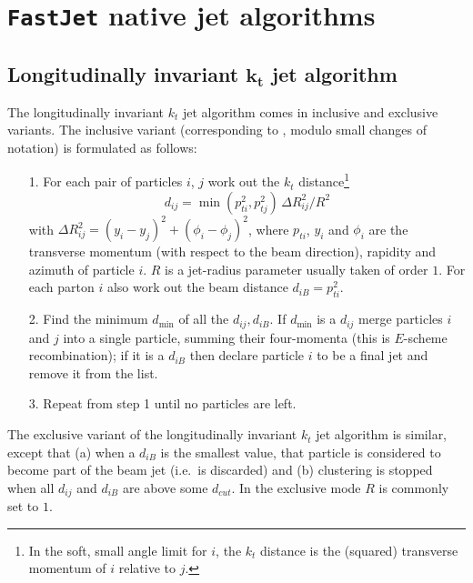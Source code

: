 \documentclass[12pt,a4]{article}
\newcommand{\fastjet}{\texttt{FastJet}\xspace}
\begin{document}
\section{\fastjet native jet algorithms}
\label{sec:native-algs}

\subsection[Longitudinally invariant $k_t$ jet algorithm]{Longitudinally invariant $\boldsymbol{k_t}$ jet algorithm}
%
The longitudinally invariant $k_t$ jet algorithm \cite{ktexcl,ktincl}
comes in inclusive and exclusive variants.
%
The inclusive variant (corresponding to \cite{ktincl}, modulo small
changes of notation) is formulated as follows:
\begin{itemize}
\item[1.] For each pair of particles $i$, $j$ work out the $k_t$
  distance\footnote{In the soft, small angle limit for $i$, the $k_t$
    distance is the (squared) transverse momentum of $i$ relative to $j$.}
  \begin{equation}
    \label{eq:dij}
    d_{ij} = \min(p_{ti}^2,{p_{tj}^2}) \, \Delta R_{ij}^2 / R^2
  \end{equation}
  with $\Delta R_{ij}^2 = (y_i-y_j)^2 + (\phi_i-\phi_j)^2$,
  where $p_{ti}$, $y_i$ and $\phi_i$ are the transverse momentum (with
  respect to the beam direction),
  rapidity and azimuth of particle $i$. $R$ is a jet-radius
  parameter usually taken of order $1$. For each parton $i$ also work
  out the beam distance $d_{iB} = p_{ti}^2$.
\item[2.] Find the minimum $d_{\min}$ of all the $d_{ij},d_{iB}$. If
  $d_{\min}$ is a $d_{ij}$ merge particles $i$ and $j$ into a single
  particle, summing their four-momenta (this is $E$-scheme
  recombination); if it is a $d_{iB}$ then declare particle $i$ to be
  a final jet and remove it from the list.
\item[3.] Repeat from step 1 until no particles are left.
\end{itemize}
The exclusive variant of the longitudinally invariant $k_t$ jet
algorithm \cite{ktexcl} is similar, except that (a) when a $d_{iB}$ is
the smallest value, that particle is considered to become part of the
beam jet (i.e.\ is discarded) and (b) clustering is stopped when all
$d_{ij}$ and $d_{iB}$ are above some $d_{cut}$. In the exclusive mode
$R$ is commonly set to $1$.
\end{document}

